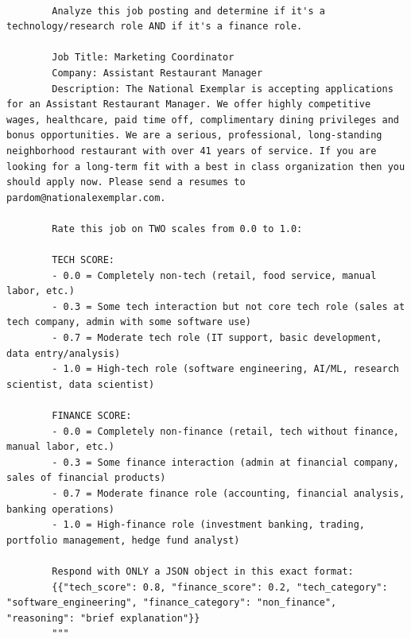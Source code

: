 \documentclass{article}
\begin{document}
\begin{lstlisting}[breaklines=true,
    caption={LinkedIn job classification prompt used with \texttt{GPT-OSS-20B}.
        Generation parameters: \texttt{max\_tokens}=800,
        \texttt{temperature}=0.1.},
    label={lst:linkedin_prompt}]

        Analyze this job posting and determine if it's a technology/research role AND if it's a finance role.
        
        Job Title: Marketing Coordinator
        Company: Assistant Restaurant Manager
        Description: The National Exemplar is accepting applications for an Assistant Restaurant Manager. We offer highly competitive wages, healthcare, paid time off, complimentary dining privileges and bonus opportunities. We are a serious, professional, long-standing neighborhood restaurant with over 41 years of service. If you are looking for a long-term fit with a best in class organization then you should apply now. Please send a resumes to pardom@nationalexemplar.com.
        
        Rate this job on TWO scales from 0.0 to 1.0:
        
        TECH SCORE:
        - 0.0 = Completely non-tech (retail, food service, manual labor, etc.)
        - 0.3 = Some tech interaction but not core tech role (sales at tech company, admin with some software use)
        - 0.7 = Moderate tech role (IT support, basic development, data entry/analysis)
        - 1.0 = High-tech role (software engineering, AI/ML, research scientist, data scientist)
        
        FINANCE SCORE:
        - 0.0 = Completely non-finance (retail, tech without finance, manual labor, etc.)
        - 0.3 = Some finance interaction (admin at financial company, sales of financial products)
        - 0.7 = Moderate finance role (accounting, financial analysis, banking operations)
        - 1.0 = High-finance role (investment banking, trading, portfolio management, hedge fund analyst)
        
        Respond with ONLY a JSON object in this exact format:
        {{"tech_score": 0.8, "finance_score": 0.2, "tech_category": "software_engineering", "finance_category": "non_finance", "reasoning": "brief explanation"}}
        """
    
\end{lstlisting}
\end{document}
